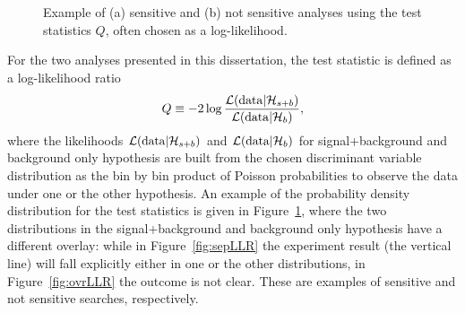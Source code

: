 \begin{figure}[htb]\begin{center}
	\caption{Example of (a) sensitive and (b) not sensitive analyses using the test 
        statistics $Q$, often chosen as a log-likelihood.\label{fig:LLR}} %
\end{center}\end{figure}


For the two analyses presented in this dissertation, the test statistic
is defined as a log-likelihood ratio 
\begin{equation}\label{eq:llr}
Q \equiv -2\log \dfrac{\mathcal{L}({\rm data}|\mathcal{H}_{s+b})}{\mathcal{L}({\rm data}|\mathcal{H}_{b})},
\end{equation}
where the likelihoods $\mathcal{L}({\rm data}|\mathcal{H}_{s+b})$
 and $\mathcal{L}({\rm data}|\mathcal{H}_{b})$ for 
signal+background and background only hypothesis
are built from the chosen discriminant variable distribution 
as the bin by bin product of Poisson probabilities to observe the
data under one or the other hypothesis.
An example of the probability density distribution
for the test statistics is given in Figure~\ref{fig:LLR},
where the two distributions in the signal+background and background only hypothesis
have a different overlay: while in Figure~\ref{fig:sepLLR} the experiment
result (the vertical line) will fall explicitly either
in one or the other distributions, in Figure~\ref{fig:ovrLLR} the
outcome is not clear. These are examples of sensitive and not sensitive searches,
respectively.

